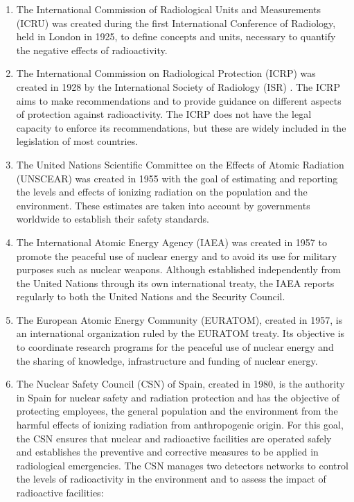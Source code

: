 \begin{enumerate}
\item{} The International Commission of Radiological Units and Measurements (ICRU) \cite{ICRU} was created during the first International Conference of Radiology, held in London in 1925, to define concepts and units, necessary to quantify the negative effects of radioactivity.

\item{} The International Commission on Radiological Protection (ICRP) \cite{ICRP} was created in 1928 by the International Society of Radiology (ISR) \cite{ISR}. The ICRP aims to make recommendations and to provide guidance on different aspects of protection against radioactivity. The ICRP does not have the legal capacity to enforce its recommendations, but these are widely included in the legislation of most countries. %

\item{} The United Nations Scientific Committee on the Effects of Atomic Radiation (UNSCEAR) \cite{UNSCEAR} was created in 1955 with the goal of estimating and reporting the levels and effects of ionizing radiation on the population and the environment. These estimates are taken into account by governments worldwide to establish their safety standards.

\item{} The International Atomic Energy Agency (IAEA) \cite{IAEA} was created in 1957 to promote the peaceful use of nuclear energy and to avoid its use for military purposes such as nuclear weapons. Although established independently from the United Nations through its own international treaty, the IAEA reports regularly to both the United Nations and the Security Council.

\item{} The European Atomic Energy Community (EURATOM), created in 1957, is an international organization ruled by the EURATOM treaty. Its objective is to coordinate research programs for the peaceful use of nuclear energy and the sharing of knowledge, infrastructure and funding of nuclear energy.

\item{} The Nuclear Safety Council (CSN) \cite{CSN} of Spain, created in 1980, is the authority in Spain for nuclear safety and radiation protection and has the objective of protecting employees, the general population and the environment from the harmful effects of ionizing radiation from anthropogenic origin. For this goal, the CSN ensures that nuclear and radioactive facilities are operated safely and establishes the preventive and corrective measures to be applied in radiological emergencies. The CSN manages two detectors networks to control the levels of radioactivity in the environment and to assess the impact of radioactive facilities:


\end{enumerate}
